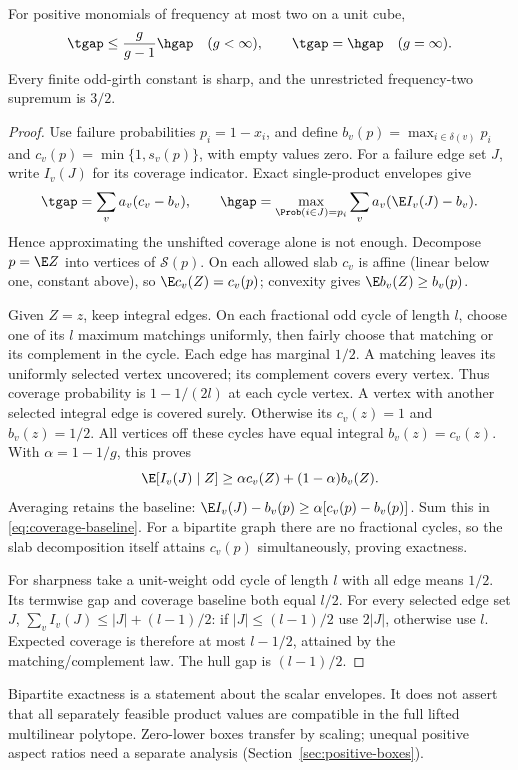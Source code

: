 \begin{theorem}\label{thm:frequency-two}
For positive monomials of frequency at most two on a unit cube,
\[
 \tgap\le\frac{g}{g-1}\hgap\quad(g<\infty),
 \qquad \tgap=\hgap\quad(g=\infty).
\]
Every finite odd-girth constant is sharp, and the unrestricted
frequency-two supremum is $3/2$.
\end{theorem}
\begin{proof}
Use failure probabilities $p_i=1-x_i$, and define
$b_v(p)=\max_{i\in\delta(v)}p_i$ and $c_v(p)=\min\{1,s_v(p)\}$,
with empty values zero. For a failure edge set $J$, write $I_v(J)$ for
its coverage indicator. Exact single-product envelopes give
\begin{equation}\label{eq:coverage-baseline}
 \tgap=\sum_v a_v(c_v-b_v),\qquad
 \hgap=\max_{\Prob(i\in J)=p_i}\sum_v a_v(\E I_v(J)-b_v).
\end{equation}
Hence approximating the unshifted coverage alone is not enough.
Decompose $p=\E Z$ into vertices of $\mathcal S(p)$. On each allowed
slab $c_v$ is affine (linear below one, constant above), so
$\E c_v(Z)=c_v(p)$; convexity gives $\E b_v(Z)\ge b_v(p)$.

Given $Z=z$, keep integral edges. On each fractional odd cycle of length
$l$, choose one of its $l$ maximum matchings uniformly, then fairly
choose that matching or its complement in the cycle. Each edge has
marginal $1/2$. A matching leaves its uniformly selected vertex uncovered;
its complement covers every vertex. Thus coverage probability is
$1-1/(2l)$ at each cycle vertex. A vertex with another selected integral
edge is covered surely. Otherwise its $c_v(z)=1$ and $b_v(z)=1/2$.
All vertices off these cycles have equal integral $b_v(z)=c_v(z)$.
With $\alpha=1-1/g$, this proves
\[
 \E[I_v(J)\mid Z]\ge\alpha c_v(Z)+(1-\alpha)b_v(Z).
\]
Averaging retains the baseline:
$\E I_v(J)-b_v(p)\ge\alpha[c_v(p)-b_v(p)]$.
Sum this in \eqref{eq:coverage-baseline}. For a bipartite graph there
are no fractional cycles, so the slab decomposition itself attains
$c_v(p)$ simultaneously, proving exactness.

For sharpness take a unit-weight odd cycle of length $l$ with all edge
means $1/2$. Its termwise gap and coverage baseline both equal $l/2$.
For every selected edge set $J$,
$\sum_vI_v(J)\le|J|+(l-1)/2$: if $|J|\le(l-1)/2$ use $2|J|$,
otherwise use $l$. Expected coverage is therefore at most $l-1/2$,
attained by the matching/complement law. The hull gap is $(l-1)/2$.
\end{proof}
Bipartite exactness is a statement about the scalar envelopes. It does not
assert that all separately feasible product values are
compatible in the full lifted multilinear polytope. Zero-lower boxes
transfer by scaling; unequal positive aspect ratios need a separate
analysis (Section~\ref{sec:positive-boxes}).

